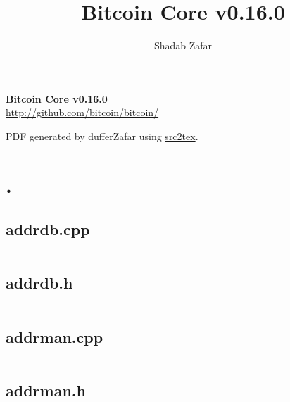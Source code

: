 \documentclass{article}
\begin{document}

\title{Bitcoin Core v0.16.0}
\author{Shadab Zafar}

\begin{titlepage}
   \begin{center}
    \Huge
    \textbf{Bitcoin Core v0.16.0} \\


    \LARGE
    \href{http://github.com/bitcoin/bitcoin/}{http://github.com/bitcoin/bitcoin/}


    \large
    PDF generated by dufferZafar using \href{http://github.com/dufferzafar/src2tex}{src2tex}.
   \end{center}
\end{titlepage}

\newpage

\tableofcontents
\newpage



\section{.}

\subsection{addrdb.cpp}
\inputminted{cpp}{/home/dufferzafar/dev/@clones/bitcoin/src/addrdb.cpp}
\newpage

\subsection{addrdb.h}
\inputminted{cpp}{/home/dufferzafar/dev/@clones/bitcoin/src/addrdb.h}
\newpage

\subsection{addrman.cpp}
\inputminted{cpp}{/home/dufferzafar/dev/@clones/bitcoin/src/addrman.cpp}
\newpage

\subsection{addrman.h}
\inputminted{cpp}{/home/dufferzafar/dev/@clones/bitcoin/src/addrman.h}
\newpage
\end{document}
